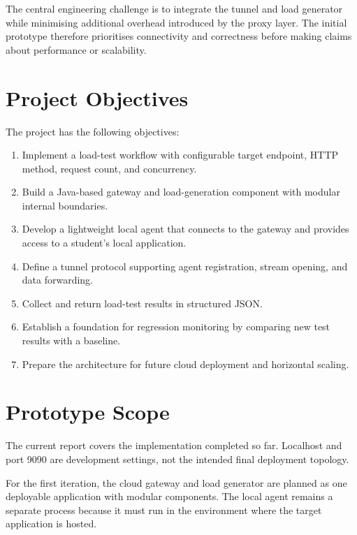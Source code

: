 \documentclass[11pt,a4paper,oneside]{report}
\begin{document}
The central engineering challenge is to integrate the tunnel
and load generator while minimising additional overhead
introduced by the proxy layer. The initial prototype therefore
prioritises connectivity and correctness before making claims
about performance or scalability.

\section{Project Objectives}

The project has the following objectives:

\begin{enumerate}
  \item Implement a load-test workflow with configurable target
  endpoint, HTTP method, request count, and concurrency.

  \item Build a Java-based gateway and load-generation component
  with modular internal boundaries.

  \item Develop a lightweight local agent that connects to the
  gateway and provides access to a student's local application.

  \item Define a tunnel protocol supporting agent registration,
  stream opening, and data forwarding.

  \item Collect and return load-test results in structured JSON.

  \item Establish a foundation for regression monitoring by
  comparing new test results with a baseline.

  \item Prepare the architecture for future cloud deployment
  and horizontal scaling.
\end{enumerate}

\section{Prototype Scope}

The current report covers the implementation completed so far.
Localhost and port 9090 are development settings, not the
intended final deployment topology.

For the first iteration, the cloud gateway and load generator
are planned as one deployable application with modular
components. The local agent remains a separate process because
it must run in the environment where the target application
is hosted.
\end{document}
